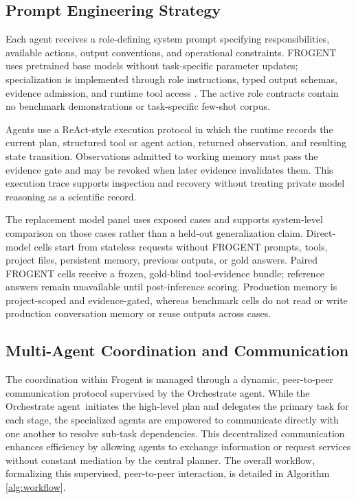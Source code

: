 \documentclass{article}
\newcommand{\name}{Frogent }
\newcommand{\oa}{Orchestrate agent}
\begin{document}
\subsection*{Prompt Engineering Strategy}
Each agent receives a role-defining system prompt specifying responsibilities, available actions, output conventions, and operational constraints. FROGENT uses pretrained base models without task-specific parameter updates; specialization is implemented through role instructions, typed output schemas, evidence admission, and runtime tool access \cite{brown2020language, wei2022chain}. The active role contracts contain no benchmark demonstrations or task-specific few-shot corpus.

Agents use a ReAct-style execution protocol \cite{yao2023react} in which the runtime records the current plan, structured tool or agent action, returned observation, and resulting state transition. Observations admitted to working memory must pass the evidence gate and may be revoked when later evidence invalidates them. This execution trace supports inspection and recovery without treating private model reasoning as a scientific record.

The replacement model panel uses exposed cases and supports system-level comparison on those cases rather than a held-out generalization claim. Direct-model cells start from stateless requests without FROGENT prompts, tools, project files, persistent memory, previous outputs, or gold answers. Paired FROGENT cells receive a frozen, gold-blind tool-evidence bundle; reference answers remain unavailable until post-inference scoring. Production memory is project-scoped and evidence-gated, whereas benchmark cells do not read or write production conversation memory or reuse outputs across cases.

\subsection*{Multi-Agent Coordination and Communication}

The coordination within \name  is managed through a dynamic, peer-to-peer communication protocol supervised by the \oa. While the \oa \ initiates the high-level plan and delegates the primary task for each stage, the specialized agents are empowered to communicate directly with one another to resolve sub-task dependencies. This decentralized communication enhances efficiency by allowing agents to exchange information or request services without constant mediation by the central planner. The overall workflow, formalizing this supervised, peer-to-peer interaction, is detailed in Algorithm \ref{alg:workflow}.
\end{document}

